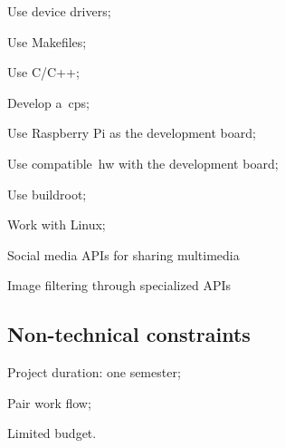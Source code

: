 \begin{item-c}
\item Use device drivers;
\item Use Makefiles;
\item Use C/C++;
\item Develop a~\gls{cps};
\item Use Raspberry Pi as the development board;
\item Use compatible~\gls{hw} with the development board;
\item Use buildroot;
\item Work with Linux;
\item Social media APIs for sharing multimedia
\item Image filtering through specialized APIs
\end{item-c}
\subsection{Non-technical constraints}
\label{sec:non-techn-constr}

\begin{item-c}
\item Project duration: one semester;
\item Pair work flow;
\item Limited budget.
\end{item-c}

